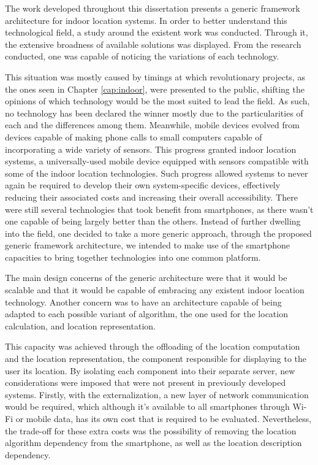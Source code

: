 \label{cap:conclusions}

The work developed throughout this dissertation presents a generic framework architecture for indoor location systems. In order to better understand this technological field, a study around the existent work was conducted. Through it, the extensive broadness of available solutions was displayed. From the research conducted, one was capable of noticing the variations of each technology. 
 
 
This situation was mostly caused by timings at which revolutionary projects, as the ones seen in Chapter \ref{cap:indoor}, were presented to the public, shifting the opinions of which technology would be the most suited to lead the field. As such, no technology has been declared the winner mostly due to the particularities of each and the differences among them. Meanwhile, mobile devices evolved from devices capable of making phone calls to small computers capable of incorporating a wide variety of sensors. This progress granted indoor location systems, a universally-used mobile device equipped with sensors compatible with some of the indoor location technologies. Such progress allowed systems to never again be required to develop their own system-specific devices, effectively reducing their associated costs and increasing their overall accessibility. There were still several technologies that took benefit from smartphones, as there wasn't one capable of being largely better than the others. Instead of further dwelling into the field, one decided to take a more generic approach, through the proposed generic framework architecture, we intended to make use of the smartphone capacities to bring together technologies into one common platform. 
 
 
The main design concerns of the generic architecture were that it would be scalable and that it would be capable of embracing any existent indoor location technology. Another concern was to have an architecture capable of being adapted to each possible variant of algorithm, the one used for the location calculation, and location representation. 

This capacity was achieved through the offloading of the location computation and the location representation, the component responsible for displaying to the user its location. By isolating each component into their separate server, new considerations were imposed that were not present in previously developed systems. Firstly, with the externalization, a new layer of network communication would be required, which although it's available to all smartphones through Wi-Fi or mobile data, has its own cost that is required to be evaluated. Nevertheless, the trade-off for these extra costs was the possibility of removing the location algorithm dependency from the smartphone, as well as the location description dependency.  
 
